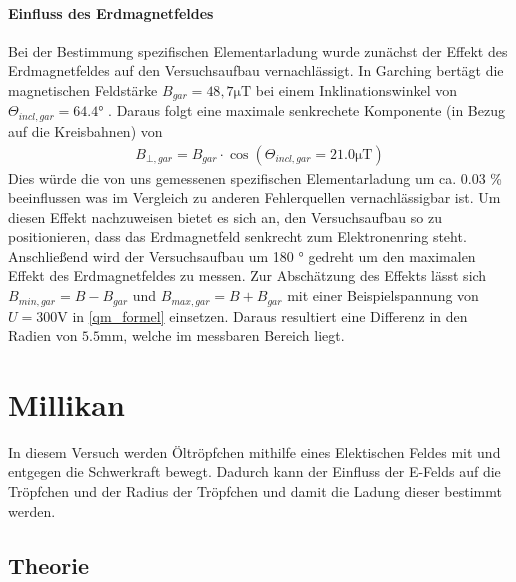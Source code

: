 \documentclass[11pt, a4paper]{article}
\begin{document}
        

    \paragraph{Einfluss des Erdmagnetfeldes}
        Bei der Bestimmung spezifischen Elementarladung wurde zunächst der Effekt des Erdmagnetfeldes auf den Versuchsaufbau
        vernachlässigt. In Garching bertägt die magnetischen Feldstärke $B_{gar} = 48,7 \si{\micro\tesla}$ \cite[]{magnetic_field} bei einem Inklinationswinkel von $\Theta_{incl,gar} = 64.4\si{\degree}$ \cite[]{magnetic_field}. 
        Daraus folgt eine maximale senkrechete Komponente (in Bezug auf die Kreisbahnen) von 
        \begin{align}
        B_{\bot,gar} = B_{gar} \cdot \cos (\Theta_{incl,gar} = 21.0 \si{\micro\tesla})
        \end{align}
        Dies würde die von uns gemessenen spezifischen Elementarladung um ca. 0.03 \% beeinflussen was im Vergleich zu anderen
        Fehlerquellen vernachlässigbar ist. 
        Um diesen Effekt nachzuweisen bietet es sich an, den Versuchsaufbau so zu positionieren, dass das Erdmagnetfeld senkrecht zum Elektronenring steht.
        Anschließend wird der Versuchsaufbau um 180 \si{\degree} gedreht um den maximalen Effekt des Erdmagnetfeldes zu messen.
        Zur Abschätzung des Effekts lässt sich $B_{min,gar} = B - B_{gar}$ und $B_{max,gar} = B + B_{gar}$ mit einer Beispielspannung von $ U = 300 \si{\volt}$ in \ref{qm_formel} einsetzen.
        Daraus resultiert eine Differenz in den Radien von $5.5 \si{\milli\metre}$, welche im messbaren Bereich liegt.

    

    \section{Millikan}

    In diesem Versuch werden Öltröpfchen mithilfe eines Elektischen Feldes mit und entgegen die Schwerkraft bewegt. Dadurch kann der Einfluss der E-Felds auf die Tröpfchen und der Radius der Tröpfchen und damit die Ladung dieser bestimmt werden.

    \subsection{Theorie}
\end{document}
